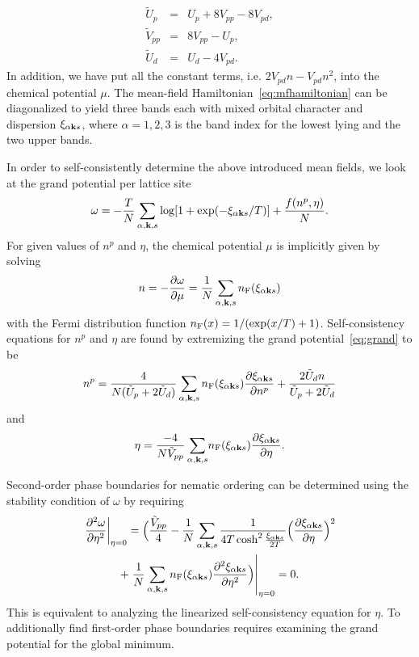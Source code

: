 \documentclass[prb, twocolumn,showpacs,preprintnumbers,amsmath,amssymb, floatfix]{revtex4}
\begin{document}
\begin{eqnarray}
  \tilde{U}_{p} &=& U_{p} + 8V_{pp} - 8 V_{pd},\label{eq:Uptilde}\\
  \tilde{V}_{pp} &=&  8V_{pp} - U_{p},\label{eq:Vptilde}\\
  \tilde{U}_{d} &=& U_{d} - 4V_{pd}.
  \label{eq:Udtilde}
\end{eqnarray}
In addition, we have put all the constant terms, i.e. $2V_{pd}n - V_{pd}n^2$, into the chemical potential $\mu$.
The mean-field Hamiltonian~\eqref{eq:mfhamiltonian} can be diagonalized to yield three bands
each with mixed orbital character and dispersion $\xi_{\alpha{\bf k} s}$, where $\alpha=1,2,3$ is the
band index for the lowest lying and the two upper bands.

In order to self-consistently determine the above introduced mean fields, we look at the grand potential per lattice site
\begin{equation}
  \omega = -\frac{T}{N}\sum_{\alpha, {\bf k}, s} \log[1 + \exp(-\xi_{\alpha {\bf k} s}/T)] + \frac{f(n^{p}, \eta)}N.
  \label{eq:grand}
\end{equation}
For given values of $n^{p}$ and $\eta$, the chemical potential $\mu$ is implicitly given by solving
\begin{equation}
  n = -\frac{\partial\omega}{\partial\mu}=\frac{1}{N}\sum_{\alpha, {\bf k}, s} n_{\rm F}(\xi_{\alpha{\bf k} s})
  \label{eq:implicitmu}
\end{equation}
with the Fermi distribution function $n_{\rm F}(x)=1/(\exp(x/T) +1)$.
Self-consistency equations for $n^p$ and $\eta$ are found by
extremizing the grand potential~\eqref{eq:grand} to be
\begin{equation}
  n^{p} = \frac{4}{N(\tilde{U}_{p} + 2\tilde{U}_{d})}\sum_{\alpha, {\bf k}, s}n_{\rm F}(\xi_{\alpha{\bf k} s})\frac{\partial \xi_{\alpha{\bf k} s}}{\partial n^{p}} + \frac{2\tilde{U}_{d}n}{\tilde{U}_{p} + 2\tilde{U}_{d}}
  \label{eq:selfconn}
\end{equation}
and
\begin{equation}
  \eta =   \frac{-4}{N\tilde{V}_{pp}}\sum_{\alpha, {\bf k},s}\!n_{\rm F}(\xi_{\alpha{\bf k} s})\frac{\partial \xi_{\alpha{\bf k} s}}{\partial \eta}.
  \label{eq:selfconeta}
\end{equation}

Second-order phase boundaries for nematic ordering can be determined using the stability condition of $\omega$
by requiring
\begin{multline}
  \left.\frac{\partial^2\omega}{\partial\eta^2}\right|_{\eta=0} =
  \Big( \frac{\tilde{V}_{pp}}{4}-\frac{1}{N}\sum_{\alpha, {\bf k}, s}\frac{1}{4T\cosh^2\frac{\xi_{\alpha{\bf k} s}}{2T}}\Big(\frac{\partial\xi_{\alpha {\bf k} s}}{\partial \eta}\Big)^2 \\
  + \left.  \frac{1}{N}\sum_{\alpha, {\bf k}, s} n_{\rm F}(\xi_{\alpha{\bf k}
      s})\frac{\partial^2\xi_{\alpha {\bf k} s}}{\partial \eta^2} \Big)\right|_{\eta=0}=0.
  \label{eq:omegaetaeta}
\end{multline}
This is equivalent to analyzing the linearized self-consistency
equation for $\eta$. To additionally find first-order phase boundaries requires
examining the grand potential for the global minimum.
\end{document}
